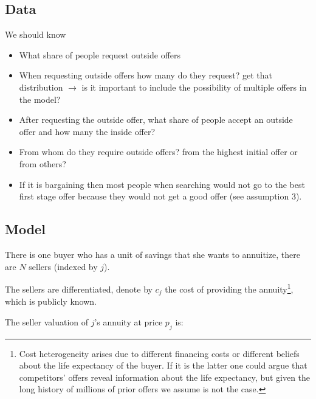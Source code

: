 \documentclass[12pt]{article}
\theoremstyle{plain}
\theoremstyle{plain}
\begin{document}
 


\subsection{Data}

We should know 
\begin{itemize}
    \item What share of people request outside offers 
    
    \item When requesting outside offers how many do they request? get that distribution $\rightarrow$ is it important to include the possibility of multiple offers in the model? 

    \item After requesting the outside offer, what share of people accept an outside offer and how many the inside offer? 
    
    \item From whom do they require outside offers? from the highest initial offer or from others? 

    \item If it is bargaining then most people when searching would not go to the best first stage offer because they would not get a good offer (see assumption 3). 
\end{itemize}

 

\subsection*{Model}
There is one buyer who has a unit of savings that she wants to annuitize, there are  $N$ sellers (indexed by $j$). 

The sellers are differentiated, denote by $c_j$ the cost of providing the annuity\footnote{Cost heterogeneity arises due to different financing costs or  different beliefs about the life expectancy of the buyer. If it is the latter one could argue that competitors' offers reveal information about the life expectancy, but given the long history of millions of prior offers we assume is not the case.}, which is publicly known.

The seller valuation of $j$'s annuity at price $p_j$ is: 
\end{document}
